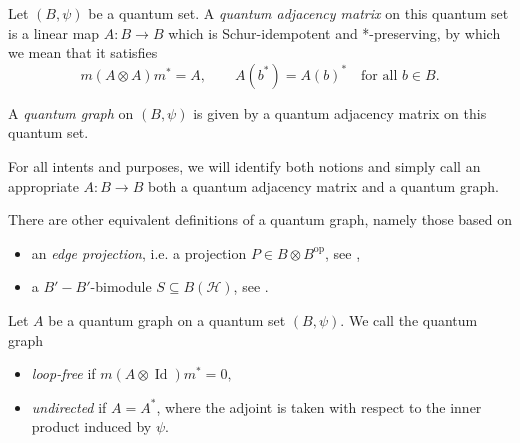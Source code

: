 \begin{definition}
    \label{def:quantum-adjacency-matrix}
    Let \( (B, \psi) \) be a quantum set. A \emph{quantum adjacency
    matrix} on this quantum set is a linear map \( A\colon B \rightarrow B
    \) which is Schur-idempotent and *-preserving, by which we mean
    that it satisfies
    \[
        m(A \otimes A)m^{*} = A,
        \qquad
        A(b^{*}) = A(b)^{*}
        \quad \text{for all } b \in B.
    \]
\end{definition}

\begin{definition}
    \label{def:quantum-graph}
    A \emph{quantum graph} on \( (B, \psi) \) is given by a quantum
    adjacency matrix on this quantum set.
\end{definition}

For all intents and purposes, we will identify both notions and simply
call an appropriate \( A\colon B \rightarrow B \) both a quantum
adjacency matrix and a quantum graph.

\begin{remark}
    \label{rem:other-quantum-graph-definitions}
    There are other equivalent definitions of a quantum graph, namely those
    based on
    \begin{itemize}
        \item an \emph{edge projection}, i.e. a projection \(
            P \in B \otimes B^{\operatorname{op}} \), see
            \textcite{musto18},
        \item a \( B' - B' \)-bimodule \( S \subseteq
            B(\mathcal{H}) \), see \textcite{weaver2010}.
    \end{itemize}
\end{remark}

\begin{definition}[Definition~4.6]
    \label{def:quantum-loop-free}
    Let \( A \) be a quantum graph on a quantum set \( (B, \psi) \).
    We call the quantum graph
    \begin{itemize}
        \item \emph{loop-free} if \( m(A \otimes
            \operatorname{Id})m^{*} = 0, \)
        \item \emph{undirected} if \( A = A^{*} \), where the adjoint
            is taken with respect to the inner product induced by
            \( \psi \).
    \end{itemize}
\end{definition}

